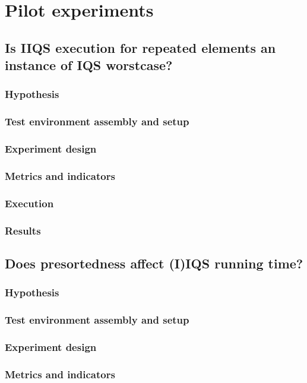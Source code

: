 \documentclass{iccmemoria}
\begin{document}
\section{Pilot experiments}

\subsection{Is IIQS execution for repeated elements an instance of IQS worstcase?}
\subsubsection{Hypothesis}
\subsubsection{Test environment assembly and setup}
\subsubsection{Experiment design}
\subsubsection{Metrics and indicators}
\subsubsection{Execution}
\subsubsection{Results}

\subsection{Does presortedness affect (I)IQS running time?}
\subsubsection{Hypothesis}
\subsubsection{Test environment assembly and setup}
\subsubsection{Experiment design}
\subsubsection{Metrics and indicators}
\end{document}

